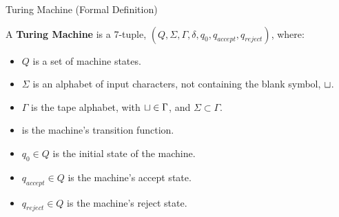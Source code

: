 \documentclass[c]{beamer}
\begin{document}
\begin{frame}{Turing Machine (Formal Definition)}

  \begin{definition}

    A \textbf{Turing Machine} is a 7-tuple, $(Q, \Sigma, \Gamma,
    \delta, q_0, q_{accept}, q_{reject})$, where:

    \begin{itemize}
    \item $Q$ is a set of machine states.
    \item $\Sigma$ is an alphabet of input characters, not containing
      the blank symbol, $\sqcup$.
    \item $\Gamma$ is the tape alphabet, with $\sqcup \in \Gamma$, and
      $\Sigma \subset \Gamma$.
    \item {} is the machine's transition
      function.
    \item $q_0 \in Q$ is the initial state of the machine.
    \item $q_{accept} \in Q$ is the machine's accept state.
    \item $q_{reject} \in Q$ is the machine's reject state.
    \end{itemize}
  \end{definition}
  
\end{frame}
\end{document}

